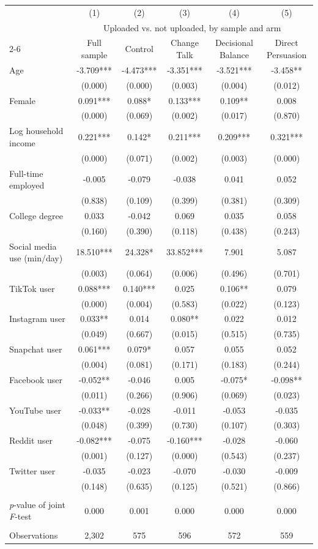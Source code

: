 \begin{tabular}{l*{5}c}
\toprule
 & (1) & (2) & (3) & (4) & (5) \\
 & \multicolumn{5}{c}{Uploaded vs. not uploaded, by sample and arm}\\ \cmidrule(lr){2-6}
  & Full sample & Control & Change Talk & Decisional Balance & Direct Persuasion \\
\midrule
Age&-3.709***&-4.473***&-3.351***&-3.521***&-3.458**\\
&(0.000)&(0.000)&(0.003)&(0.004)&(0.012)\\
Female&0.091***&0.088*&0.133***&0.109**&0.008\\
&(0.000)&(0.069)&(0.002)&(0.017)&(0.870)\\
Log household income&0.221***&0.142*&0.211***&0.209***&0.321***\\
&(0.000)&(0.071)&(0.002)&(0.003)&(0.000)\\
Full-time employed&-0.005&-0.079&-0.038&0.041&0.052\\
&(0.838)&(0.109)&(0.399)&(0.381)&(0.309)\\
College degree&0.033&-0.042&0.069&0.035&0.058\\
&(0.160)&(0.390)&(0.118)&(0.438)&(0.243)\\
Social media use (min/day)&18.510***&24.328*&33.852***&7.901&5.087\\
&(0.003)&(0.064)&(0.006)&(0.496)&(0.701)\\
TikTok user&0.088***&0.140***&0.025&0.106**&0.079\\
&(0.000)&(0.004)&(0.583)&(0.022)&(0.123)\\
Instagram user&0.033**&0.014&0.080**&0.022&0.012\\
&(0.049)&(0.667)&(0.015)&(0.515)&(0.735)\\
Snapchat user&0.061***&0.079*&0.057&0.055&0.052\\
&(0.004)&(0.081)&(0.171)&(0.183)&(0.244)\\
Facebook user&-0.052**&-0.046&0.005&-0.075*&-0.098**\\
&(0.011)&(0.266)&(0.906)&(0.069)&(0.023)\\
YouTube user&-0.033**&-0.028&-0.011&-0.053&-0.035\\
&(0.048)&(0.399)&(0.730)&(0.107)&(0.303)\\
Reddit user&-0.082***&-0.075&-0.160***&-0.028&-0.060\\
&(0.001)&(0.127)&(0.000)&(0.543)&(0.237)\\
Twitter user&-0.035&-0.023&-0.070&-0.030&-0.009\\
&(0.148)&(0.635)&(0.125)&(0.521)&(0.866)\\
& & & & & \\ \textit{p}-value of joint \textit{F}-test & 0.000 & 0.001 & 0.000 & 0.000 & 0.000 \\ & & & & & \\ \hline
Observations & 2,302 & 575 & 596 & 572 & 559 \\
\bottomrule
\end{tabular}
